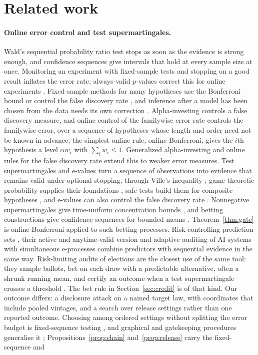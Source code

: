 \documentclass{jpc}
\theoremstyle{remark}
\begin{document}
\section{Related work}\label{sec:related}
\paragraph{Online error control and test supermartingales.} Wald's sequential probability ratio test \cite{wald1945} stops as soon as the evidence is strong enough, and confidence sequences \cite{darling1967,robbins1970,lai1976} give intervals that hold at every sample size at once. Monitoring an experiment with fixed-sample tests and stopping on a good result inflates the error rate; always-valid $p$-values correct this for online experiments \cite{johari2022}. Fixed-sample methods for many hypotheses use the Bonferroni bound \cite{dunn1961} or control the false discovery rate \cite{benjamini1995}, and inference after a model has been chosen from the data needs its own correction \cite{berk2013}. Alpha-investing \cite{foster2008} controls a false discovery measure, and online control of the familywise error rate \cite{tian2021} controls the familywise error, over a sequence of hypotheses whose length and order need not be known in advance; the simplest online rule, online Bonferroni, gives the $i$th hypothesis a level $\alpha w_i$ with $\sum_iw_i\le1$. Generalized alpha-investing \cite{aharoni2014} and online rules for the false discovery rate \cite{javanmard2018} extend this to weaker error measures. Test supermartingales and e-values \cite{shafer2011,vovk2021,ramdas2023} turn a sequence of observations into evidence that remains valid under optional stopping, through Ville's inequality \cite{ville1939}; game-theoretic probability supplies their foundations \cite{shafer2019}, safe tests build them for composite hypotheses \cite{grunwald2024}, and e-values can also control the false discovery rate \cite{wang2022}. Nonnegative supermartingales give time-uniform concentration bounds \cite{howard2020}, and betting constructions give confidence sequences for bounded means \cite{howard2021,waudby2024}. Theorem~\ref{thm:gate} is online Bonferroni applied to such betting processes. Risk-controlling prediction sets \cite{bates2021}, their active and anytime-valid version \cite{xu2024} and adaptive auditing of AI systems with simultaneous e-processes \cite{zhou2026} combine predictors with sequential evidence in the same way. Risk-limiting audits of elections are the closest use of the same tool: they sample ballots, bet on each draw with a predictable alternative, often a shrunk running mean, and certify an outcome when a test supermartingale crosses a threshold \cite{stark2008,waudby2021,stark2023}. The bet rule in Section~\ref{sec:credit} is of that kind. Our outcome differs: a disclosure attack on a named target law, with coordinates that include pooled vintages, and a search over release settings rather than one reported outcome. Choosing among ordered settings without splitting the error budget is fixed-sequence testing \cite{maurer1995,hsu1999}, and graphical and gatekeeping procedures generalise it \cite{dmitrienko2007,bretz2009}; Propositions~\ref{prop:chain} and~\ref{prop:release} carry the fixed-sequence and 
\end{document}
